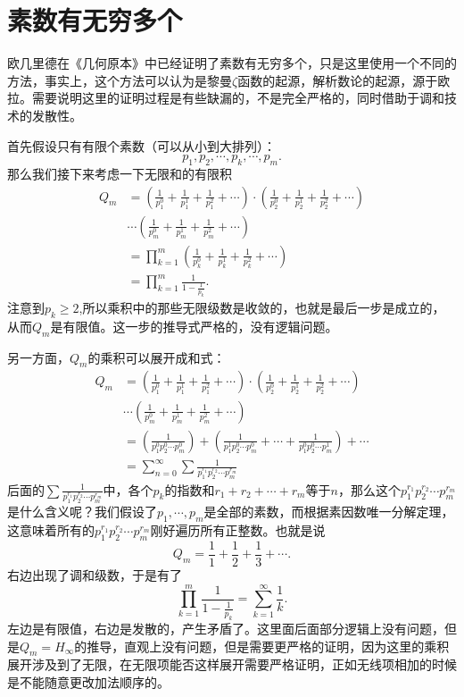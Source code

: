 \documentclass[cn]{elegantbook}
\begin{document}
\section{素数有无穷多个}
欧几里德在《几何原本》中已经证明了素数有无穷多个，只是这里使用一个不同的方法，事实上，这个方法可以认为是黎曼$\zeta$函数的起源，解析数论的起源，源于欧拉。需要说明这里的证明过程是有些缺漏的，不是完全严格的，同时借助于调和技术的发散性。

首先假设只有有限个素数（可以从小到大排列）：
\[
p_1, p_2, \cdots, p_k, \cdots, p_m.
\]
那么我们接下来考虑一下无限和的有限积
\[
\begin{aligned}
Q_m &= (\frac{1}{p_1^0} + \frac{1}{p_1^1} + \frac{1}{p_1^2} + \cdots) \cdot (\frac{1}{p_2^0} + \frac{1}{p_2^1} + \frac{1}{p_2^2} + \cdots)\\
&\cdots (\frac{1}{p_m^0} + \frac{1}{p_m^1} + \frac{1}{p_m^2} + \cdots) \\
&= \prod_{k=1}^{m}{(\frac{1}{p_k^0} + \frac{1}{p_k^1} + \frac{1}{p_k^2} + \cdots)} \\
&= \prod_{k=1}^{m}{\frac{1}{1-\frac{1}{p_k}}}.
\end{aligned}
\]
注意到$p_k \ge 2$,所以乘积中的那些无限级数是收敛的，也就是最后一步是成立的，从而$Q_m$是有限值。这一步的推导式严格的，没有逻辑问题。

另一方面，$Q_m$的乘积可以展开成和式：
\[
\begin{aligned}
Q_m &= (\frac{1}{p_1^0} + \frac{1}{p_1^1} + \frac{1}{p_1^2} + \cdots) \cdot (\frac{1}{p_2^0} + \frac{1}{p_2^1} + \frac{1}{p_2^2} + \cdots)\\
&\cdots (\frac{1}{p_m^0} + \frac{1}{p_m^1} + \frac{1}{p_m^2} + \cdots) \\
&= (\frac{1}{p_1^0p_2^0 \cdots p_m^0}) + (\frac{1}{p_1^1p_2^0\cdots p_m^0} + \cdots + \frac{1}{p_1^0p_2^0\cdots p_m^1}) + \cdots \\
&= \sum_{n=0}^{\infty}{\sum{\frac{1}{p_1^{r_1}p_2^{r_2}\cdots p_m^{r_m}}}}
\end{aligned}
\]
后面的$\sum{\frac{1}{p_1^{r_1}p_2^{r_2}\cdots p_m^{r_m}}}$中，各个$p_k$的指数和$r_1+r_2+\cdots+r_m$等于$n$，那么这个$p_1^{r_1}p_2^{r_2}\cdots p_m^{r_m}$是什么含义呢？我们假设了$p_1,\cdots,p_m$是全部的素数，而根据素因数唯一分解定理，这意味着所有的$p_1^{r_1}p_2^{r_2}\cdots p_m^{r_m}$刚好遍历所有正整数。也就是说
\[
Q_m = \frac{1}{1} + \frac{1}{2} + \frac{1}{3}+\cdots.
\]
右边出现了调和级数，于是有了
\[
\prod_{k=1}^{m}{\frac{1}{1 - \frac{1}{p_k}}} = \sum_{k=1}^{\infty}{\frac{1}{k}}.
\]
左边是有限值，右边是发散的，产生矛盾了。这里面后面部分逻辑上没有问题，但是$Q_m=H_{\infty}$的推导，直观上没有问题，但是需要更严格的证明，因为这里的乘积展开涉及到了无限，在无限项能否这样展开需要严格证明，正如无线项相加的时候是不能随意更改加法顺序的。
\end{document}
